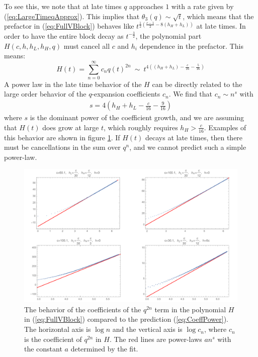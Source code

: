 \documentclass[12pt]{article}
\numberwithin{equation}{section}
\newcommand{\be}{\begin{eqnarray}}
\newcommand{\ee}{\end{eqnarray}}
\begin{document}
To see this, we note that at late times $q$ approaches $1$ with a rate given by (\ref{eq:LargeTimeqApprox}). This implies that $\theta_{3}(q)\sim\sqrt{t}$, which means that the prefactor in (\ref{eq:FullVBlock}) behaves like  $t^{\frac{1}{2}\left(\frac{c-1}{2}-8(h_{H}+h_{L})\right)}$ at late times. In order to have the entire block decay as $t^{-\frac{3}{2}}$, the polynomial part $H\left(c,h,h_L, h_H ,q\right)$ must  cancel all $c$ and $h_i$ dependence in the prefactor. This means: 
\begin{equation}
H(t)={\displaystyle \sum_{n=0}^{\infty}}c_{n}q(t)^{2n} \ \sim \ t^{4\left((h_{H}+h_{L})-\frac{c}{16}-\frac{5}{16}\right)}\label{eq:PowerSum}
\end{equation}
A power law in the late time behavior of the $H$ can be directly related to the large order behavior of the $q$-expansion coefficients $c_n$.  We find that $c_{n} \sim n^{s}$ with 
\be
\label{eq:CoeffPower}
s=4\left(h_{H}+h_{L} - \frac{c}{16}-\frac{9}{16}\right)
\ee
where $s$ is the dominant power of the coefficient growth, and we are assuming that $H(t)$ does grow at large $t$, which roughly requires $h_H > \frac{c}{16}$. Examples of this behavior are shown in figure \ref{fig:Coeffpower}.  
 If $H(t)$ decays at late times, then there must be cancellations in the sum over $q^n$, and we cannot predict such a simple power-law.

\begin{figure}[H]
\centering{}\includegraphics[scale=0.5]{Coeffpower}\caption{The behavior of the coefficients of the $q^{2n}$ term in the polynomial $H$ in (\ref{eq:FullVBlock}) compared to the prediction (\ref{eq:CoeffPower}). The horizontal axis is $\log n$ and the vertical axis is $\log c_{n}$, where $c_n$ is the coefficient of $q^{2n}$ in $H$. The red lines are power-laws $a n^s$ with the constant $a$ determined by the fit. \label{fig:Coeffpower}}
\end{figure}
\end{document}
